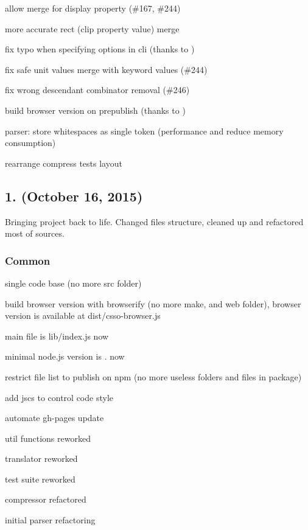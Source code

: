 \begin{DoxyItemize}
\item allow merge for {\ttfamily display} property (\#167, \#244)
\item more accurate {\ttfamily rect} ({\ttfamily clip} property value) merge
\item fix typo when specifying options in cli (thanks to )
\item fix safe unit values merge with keyword values (\#244)
\item fix wrong descendant combinator removal (\#246)
\item build browser version on {\ttfamily prepublish} (thanks to )
\item parser\+: store whitespaces as single token (performance and reduce memory consumption)
\item rearrange compress tests layout
\end{DoxyItemize}

\subsection*{1. (October 16, 2015)}

Bringing project back to life. Changed files structure, cleaned up and refactored most of sources.

\subsubsection*{Common}


\begin{DoxyItemize}
\item single code base (no more {\ttfamily src} folder)
\item build browser version with {\ttfamily browserify} (no more {\ttfamily make}, and {\ttfamily web} folder), browser version is available at {\ttfamily dist/csso-\/browser.\+js}
\item main file is {\ttfamily lib/index.\+js} now
\item minimal {\ttfamily node.\+js} version is {.} now
\item restrict file list to publish on npm (no more useless folders and files in package)
\item add {\ttfamily jscs} to control code style
\item automate {\ttfamily gh-\/pages} update
\item util functions reworked
\item translator reworked
\item test suite reworked
\item compressor refactored
\item initial parser refactoring
\end{DoxyItemize}


